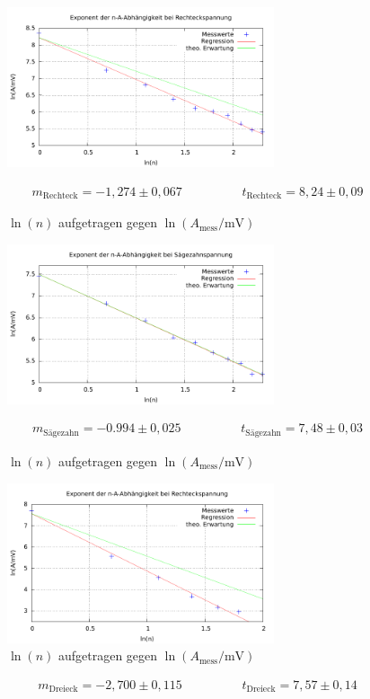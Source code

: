 \begin{figure}[H]
 \includegraphics[width=0.7\textwidth]{pics/rechteck.pdf}
 \caption{$\ln(n)$ aufgetragen gegen $\ln(A_{\text{mess}}/\text{mV})$}
 \label{pic_rechteckfit}
 \begin{align}
 m_{\text{Rechteck}} = -1,274 \pm 0,067 \hspace{2cm} t_{\text{Rechteck}} = 8,24 \pm 0,09
\end{align}
\end{figure}
\begin{figure}[H]
 \includegraphics[width=0.7\textwidth]{pics/saegezahn.pdf}
 \caption{$\ln(n)$ aufgetragen gegen $\ln(A_{\text{mess}}/\text{mV})$}
 \label{pic_saegezahnfit}
 \begin{align}
 m_{\text{Sägezahn}} = -0.994 \pm 0,025 \hspace{2cm} t_{\text{Sägezahn}} = 7,48 \pm 0,03
\end{align}
\end{figure}
\begin{figure}[H]
 \includegraphics[width=0.7\textwidth]{pics/dreieck.pdf}
 \caption{$\ln(n)$ aufgetragen gegen $\ln(A_{\text{mess}}/\text{mV})$}
 \label{pic_dreieckfit}
\end{figure}
\begin{align}
 m_{\text{Dreieck}} = -2,700 \pm 0,115 \hspace{2cm} t_{\text{Dreieck}} = 7,57 \pm 0,14
\end{align}

